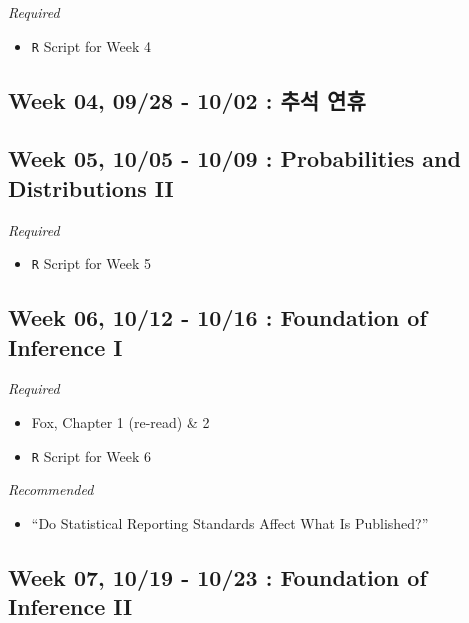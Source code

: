 \documentclass[11pt,]{article}
\providecommand{\tightlist}{%
  \setlength{\itemsep}{0pt}\setlength{\parskip}{0pt}}
\begin{document}
\emph{Required}

\begin{itemize}
\tightlist
\item
  \texttt{R} Script for Week 4
\end{itemize}

\hypertarget{week-04-0928---1002-uxcd94uxc11d-uxc5f0uxd734}{%
\subsection{Week 04, 09/28 - 10/02 : 추석
연휴}\label{week-04-0928---1002-uxcd94uxc11d-uxc5f0uxd734}}

\hypertarget{week-05-1005---1009-probabilities-and-distributions-ii}{%
\subsection{Week 05, 10/05 - 10/09 : Probabilities and Distributions
II}\label{week-05-1005---1009-probabilities-and-distributions-ii}}

\emph{Required}

\begin{itemize}
\tightlist
\item
  \texttt{R} Script for Week 5
\end{itemize}

\hypertarget{week-06-1012---1016-foundation-of-inference-i}{%
\subsection{Week 06, 10/12 - 10/16 : Foundation of Inference
I}\label{week-06-1012---1016-foundation-of-inference-i}}

\emph{Required}

\begin{itemize}
\item
  Fox, Chapter 1 (re-read) \& 2
\item
  \texttt{R} Script for Week 6
\end{itemize}

\emph{Recommended}

\begin{itemize}
\tightlist
\item
  ``Do Statistical Reporting Standards Affect What Is Published?''
\end{itemize}

\hypertarget{week-07-1019---1023-foundation-of-inference-ii}{%
\subsection{Week 07, 10/19 - 10/23 : Foundation of Inference
II}\label{week-07-1019---1023-foundation-of-inference-ii}}
\end{document}
